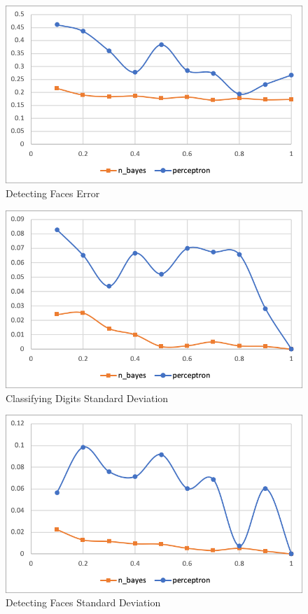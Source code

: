 \documentclass{article}
\begin{document}
\begin{figure}
\includegraphics[width = 1\textwidth]{face_error.png}
\caption{Detecting Faces Error}
\label{face_error}
\end{figure}

\begin{figure}
\includegraphics[width = 1\textwidth]{digit_std.png}
\caption{Classifying Digits Standard Deviation}
\label{digit_std}
\end{figure}

\begin{figure}
\includegraphics[width = 1\textwidth]{face_std.png}
\caption{Detecting Faces Standard Deviation}
\label{face_std}
\end{figure}
\end{document}
